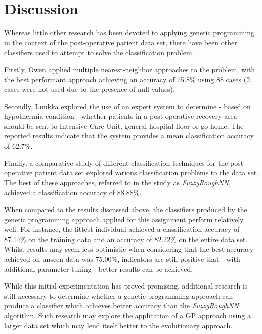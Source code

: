 \section{Discussion}
Whereas little other research has been devoted to applying genetic programming in the context of the post-operative patient data set, there have been other classifiers used to attempt to solve the classification problem.

Firstly, Owen \cite{owen1999tubular} applied multiple nearest-neighbor approaches to the problem, with the best performant approach achieving an accuracy of 75.8\% using 88 cases (2 cases were not used due to the presence of null values).

Secondly, Luukka \cite{luukka2009pca} explored the use of an expert system to determine - based on hypothermia condition - whether patients in a post-operative recovery area should be sent to Intensive Care
Unit, general hospital floor or go home. The reported results indicate that the system provides a mean classification accuracy of 62.7\%.

Finally, a comparative study of different classification techniques for the post operative patient data set \cite{dash2013comparative} explored various classification problems to the data set. The best of these approaches, referred to in the study as \emph{FuzzyRoughNN}, achieved a classification accuracy of 88.88\%.

When compared to the results discussed above, the classifiers produced by the genetic programming approach applied for this assignment perform relatively well. For instance, the fittest individual achieved a classification accuracy of 87.14\% on the training data and an accuracy of 82.22\% on the entire data set. Whilst results may seem less optimistic when considering that the best accuracy achieved on unseen data was 75.00\%, indicators are still positive that - with additional parameter tuning - better results can be achieved.

While this initial experimentation has proved promising, additional research is still necessary to determine whether a genetic programming approach can produce a classifier which achieves better accuracy than the \emph{FuzzyRoughNN} \cite{dash2013comparative} algorithm. Such research may explore the application of a GP approach using a larger data set which may lend itself better to the evolutionary approach.
